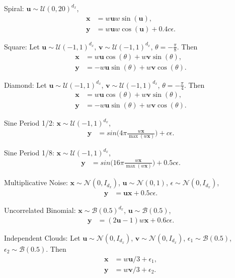 \documentclass[11pt]{article}
\providecommand{\mb}[1]{\boldsymbol{#1}}
\providecommand{\mc}[1]{\mathcal{#1}}
\begin{document}
\begin{compactenum}
\item Spiral: $\mb{u} \sim \mc{U}(0,20)^{d_{x}}$,
\begin{align*}
\mb{x}&=w\mb{u}w\sin(\mb{u}),\\
\mb{y}&=w\mb{u}w\cos(\mb{u})+0.4c\epsilon.
\end{align*}
\item Square: Let $\mb{u} \sim \mc{U}(-1,1)^{d_{x}}$, $\mb{v} \sim \mc{U}(-1,1)^{d_{x}}$, $\theta=-\frac{\pi}{8}$. Then
\begin{align*}
\mb{x}&=w\mb{u} \cos(\theta) + w\mb{v} \sin(\theta),\\
\mb{y}&=-w\mb{u} \sin(\theta) + w\mb{v} \cos(\theta).
\end{align*}
\item Diamond: Let $\mb{u} \sim \mc{U}(-1,1)^{d_{x}}$, $\mb{v} \sim \mc{U}(-1,1)^{d_{x}}$, $\theta=-\frac{\pi}{4}$. Then
\begin{align*}
\mb{x}&=w\mb{u} \cos(\theta) + w\mb{v} \sin(\theta),\\
\mb{y}&=-w\mb{u} \sin(\theta) + w\mb{v} \cos(\theta).
\end{align*}
\item Sine Period 1/2: $\mb{x} \sim \mc{U}(-1,1)^{d_{x}}$,
\begin{align*}
\mb{y}&=sin \bigg( 4\pi \frac{w\mb{x}}{\max(w\mb{x})} \bigg)+c\epsilon.
\end{align*}
\item Sine Period 1/8: $\mb{x} \sim \mc{U}(-1,1)^{d_{x}}$,
\begin{align*}
\mb{y}&=sin\bigg(16\pi \frac{w\mb{x}}{\max(w\mb{x})}\bigg)+0.5c\epsilon.
\end{align*}
\item Multiplicative Noise: $\mb{x} \sim \mc{N}(0, I_{d_{x}})$, $\mb{u} \sim \mc{N}(0, 1)$, $\epsilon \sim \mc{N}(0, I_{d_{x}})$,
\begin{align*}
\mb{y}&=\mb{u}\mb{x}+0.5c\epsilon.
\end{align*}
\item Uncorrelated Binomial: $\mb{x} \sim \mc{B}(0.5)^{d_{x}}$, $\mb{u} \sim \mc{B}(0.5)$,
\begin{align*}
\mb{y}&=(2\mb{u}-1)w\mb{x}+0.6c\epsilon.
\end{align*}
\item Independent Clouds: Let $\mb{u} \sim \mc{N}(0,I_{d_{x}})$, $\mb{v} \sim \mc{N}(0,I_{d_{x}})$, $\epsilon_{1} \sim \mc{B}(0.5)$, $\epsilon_{2} \sim \mc{B}(0.5)$. Then
\begin{align*}
\mb{x}&=w\mb{u}/3+\epsilon_{1},\\
\mb{y}&=w\mb{v}/3+\epsilon_{2}.
\end{align*}
\end{compactenum}
\end{document}
